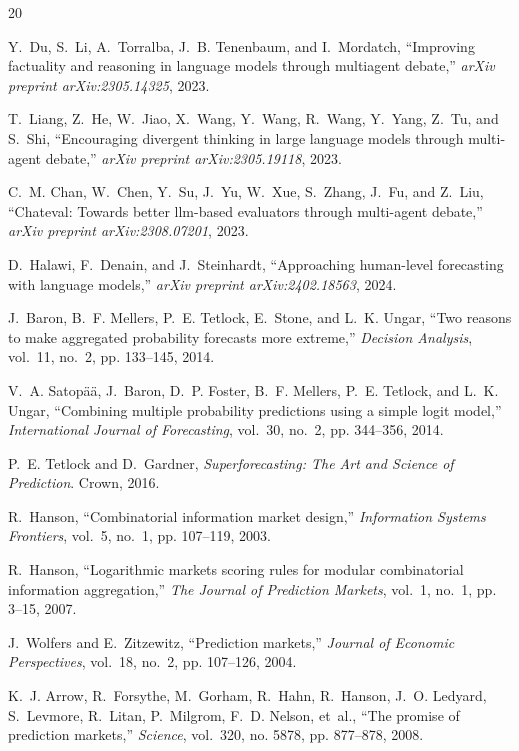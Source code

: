 \documentclass[conference]{IEEEtran}
\begin{document}
\begin{thebibliography}{20}

Y.~Du, S.~Li, A.~Torralba, J.~B. Tenenbaum, and I.~Mordatch,
``Improving factuality and reasoning in language models through multiagent debate,''
\emph{arXiv preprint arXiv:2305.14325}, 2023.

T.~Liang, Z.~He, W.~Jiao, X.~Wang, Y.~Wang, R.~Wang, Y.~Yang, Z.~Tu, and S.~Shi,
``Encouraging divergent thinking in large language models through multi-agent debate,''
\emph{arXiv preprint arXiv:2305.19118}, 2023.

C.~M. Chan, W.~Chen, Y.~Su, J.~Yu, W.~Xue, S.~Zhang, J.~Fu, and Z.~Liu,
``Chateval: Towards better llm-based evaluators through multi-agent debate,''
\emph{arXiv preprint arXiv:2308.07201}, 2023.

D.~Halawi, F.~Denain, and J.~Steinhardt,
``Approaching human-level forecasting with language models,''
\emph{arXiv preprint arXiv:2402.18563}, 2024.

J.~Baron, B.~F. Mellers, P.~E. Tetlock, E.~Stone, and L.~K. Ungar,
``Two reasons to make aggregated probability forecasts more extreme,''
\emph{Decision Analysis}, vol.~11, no.~2, pp. 133--145, 2014.

V.~A. Satop\"a\"a, J.~Baron, D.~P. Foster, B.~F. Mellers, P.~E. Tetlock, and L.~K. Ungar,
``Combining multiple probability predictions using a simple logit model,''
\emph{International Journal of Forecasting}, vol.~30, no.~2, pp. 344--356, 2014.

P.~E. Tetlock and D.~Gardner,
\emph{Superforecasting: The Art and Science of Prediction}.
Crown, 2016.

R.~Hanson,
``Combinatorial information market design,''
\emph{Information Systems Frontiers}, vol.~5, no.~1, pp. 107--119, 2003.

R.~Hanson,
``Logarithmic markets scoring rules for modular combinatorial information aggregation,''
\emph{The Journal of Prediction Markets}, vol.~1, no.~1, pp. 3--15, 2007.

J.~Wolfers and E.~Zitzewitz,
``Prediction markets,''
\emph{Journal of Economic Perspectives}, vol.~18, no.~2, pp. 107--126, 2004.

K.~J. Arrow, R.~Forsythe, M.~Gorham, R.~Hahn, R.~Hanson, J.~O. Ledyard, S.~Levmore, R.~Litan, P.~Milgrom, F.~D. Nelson, et~al.,
``The promise of prediction markets,''
\emph{Science}, vol.~320, no. 5878, pp. 877--878, 2008.


\end{thebibliography}
\end{document}

